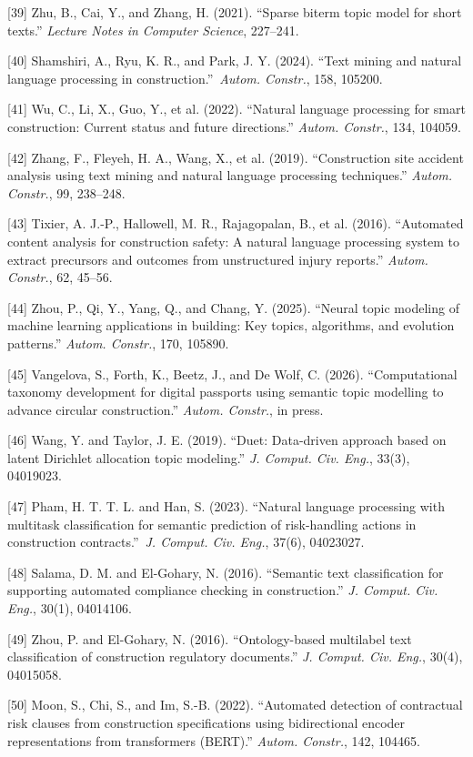 \documentclass{article}
\begin{document}
[39] Zhu, B., Cai, Y., and Zhang, H. (2021). ``Sparse biterm topic model for short texts.'' \emph{Lecture Notes in Computer Science}, 227--241.

[40] Shamshiri, A., Ryu, K. R., and Park, J. Y. (2024). ``Text mining and natural language processing in construction.''\ \emph{Autom. Constr.}, 158, 105200.

[41] Wu, C., Li, X., Guo, Y., et al. (2022). ``Natural language processing for smart construction: Current status and future directions.'' \emph{Autom. Constr.}, 134, 104059.

[42] Zhang, F., Fleyeh, H. A., Wang, X., et al. (2019). ``Construction site accident analysis using text mining and natural language processing techniques.'' \emph{Autom. Constr.}, 99, 238--248.

[43] Tixier, A. J.-P., Hallowell, M. R., Rajagopalan, B., et al. (2016). ``Automated content analysis for construction safety: A natural language processing system to extract precursors and outcomes from unstructured injury reports.'' \emph{Autom. Constr.}, 62, 45--56.

[44] Zhou, P., Qi, Y., Yang, Q., and Chang, Y. (2025). ``Neural topic modeling of machine learning applications in building: Key topics, algorithms, and evolution patterns.'' \emph{Autom. Constr.}, 170, 105890.

[45] Vangelova, S., Forth, K., Beetz, J., and De Wolf, C. (2026). ``Computational taxonomy development for digital passports using semantic topic modelling to advance circular construction.'' \emph{Autom. Constr.}, in press.

[46] Wang, Y. and Taylor, J. E. (2019). ``Duet: Data-driven approach based on latent {Dirichlet} allocation topic modeling.'' \emph{J. Comput. Civ. Eng.}, 33(3), 04019023.

[47] Pham, H. T. T. L. and Han, S. (2023). ``Natural language processing with multitask classification for semantic prediction of risk-handling actions in construction contracts.''\ \emph{J. Comput. Civ. Eng.}, 37(6), 04023027.

[48] Salama, D. M. and El-Gohary, N. (2016). ``Semantic text classification for supporting automated compliance checking in construction.'' \emph{J. Comput. Civ. Eng.}, 30(1), 04014106.

[49] Zhou, P. and El-Gohary, N. (2016). ``Ontology-based multilabel text classification of construction regulatory documents.'' \emph{J. Comput. Civ. Eng.}, 30(4), 04015058.

[50] Moon, S., Chi, S., and Im, S.-B. (2022). ``Automated detection of contractual risk clauses from construction specifications using bidirectional encoder representations from transformers ({BERT}).'' \emph{Autom. Constr.}, 142, 104465.
\end{document}
